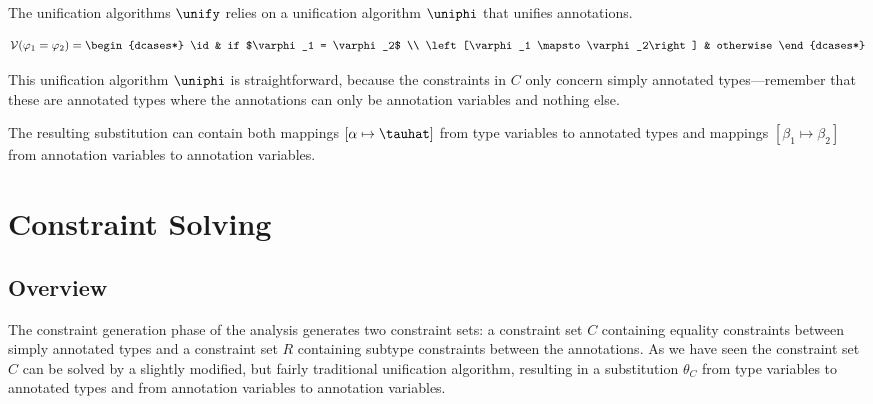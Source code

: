 The unification algorithms $\unify$ relies on a unification algorithm $\uniphi$ that unifies annotations.

\begin{eqnarray*}
\mathcal{V} (\varphi_1 = \varphi_2) =
    \begin{dcases*}
        \id                                      & if $\varphi_1 = \varphi_2$ \\
        \left[\varphi_1 \mapsto \varphi_2\right] & otherwise
    \end{dcases*}
\end{eqnarray*}

This unification algorithm $\uniphi$ is straightforward, because the constraints in $C$ only concern simply annotated types---remember that these are annotated types where the annotations can only be annotation variables and nothing else.

The resulting substitution can contain both mappings $\left[\alpha \mapsto \tauhat\right]$ from type variables to annotated types and mappings $\left[\beta_1 \mapsto \beta_2\right]$ from annotation variables to annotation variables.



\chapter{Constraint Solving}\label{chapcs}

\section{Overview}

The constraint generation phase of the analysis generates two constraint sets: a constraint set $C$ containing equality constraints between simply annotated types and a constraint set $R$ containing subtype constraints between the annotations. As we have seen the constraint set $C$ can be solved by a slightly modified, but fairly traditional unification algorithm, resulting in a substitution $\theta_C$ from type variables to annotated types and from annotation variables to annotation variables.

